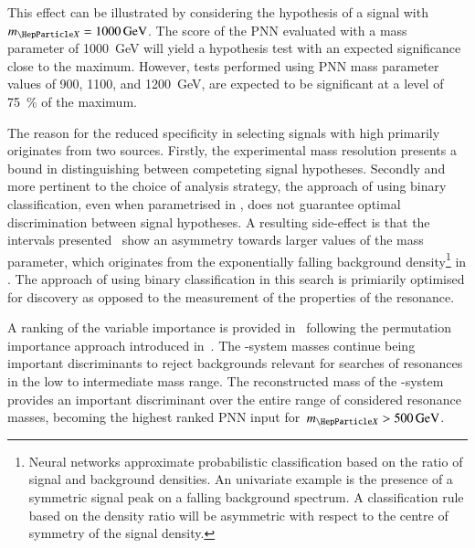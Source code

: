 This effect can be illustrated by considering the hypothesis of a
signal with $\mX = \SI{1000}{\GeV}$. The score of the PNN evaluated
with a mass parameter of \SI{1000}{\GeV} will yield a hypothesis test
with an expected significance close to the maximum. However, tests
performed using PNN mass parameter values of \num{900}, \num{1100},
and \SI{1200}{\GeV}, are expected to be significant at a level of
\SI{75}{\percent} of the maximum.

The reason for the reduced specificity in selecting signals with high
\mX primarily originates from two sources. Firstly, the experimental
mass resolution presents a bound in distinguishing between competeting
signal hypotheses. Secondly and more pertinent to the choice of
analysis strategy, the approach of using binary classification, even
when parametrised in \mX, does not guarantee optimal discrimination
between signal hypotheses. A resulting side-effect is that the
intervals presented~ show an asymmetry towards
larger values of the mass parameter, which originates from the
exponentially falling background density\footnote{Neural networks
  approximate probabilistic classification based on the ratio of
  signal and background densities. An univariate example is the
  presence of a symmetric signal peak on a falling background
  spectrum. A classification rule based on the density ratio will be
  asymmetric with respect to the centre of symmetry of the signal
  density.} in \mHH{}. The
approach of using binary classification in this search is primiarily
optimised for discovery as opposed to the measurement of the
properties of the resonance.


A ranking of the variable importance is provided
in~ following the permutation importance
approach introduced in~. The \PHiggs-system
masses continue being important discriminants to reject backgrounds
relevant for searches of resonances in the low to intermediate mass
range. The reconstructed mass of the \HH-system provides an important
discriminant over the entire range of considered resonance masses,
becoming the highest ranked PNN input for~$\mX > \SI{500}{\GeV}$.


